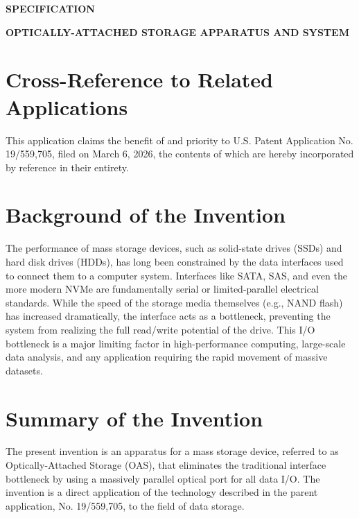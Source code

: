 \documentclass[11pt,letterpaper]{article}
\begin{document}
\thispagestyle{empty}

\begin{center}
    \textbf{\large SPECIFICATION}
\end{center}

\vspace{0.4cm}

\begin{center}
    \textbf{\large OPTICALLY-ATTACHED STORAGE APPARATUS AND SYSTEM}
\end{center}

\vspace{0.4cm}

\section*{Cross-Reference to Related Applications}

This application claims the benefit of and priority to U.S. Patent Application No. 19/559,705, filed on March 6, 2026, the contents of which are hereby incorporated by reference in their entirety.

\section*{Background of the Invention}

The performance of mass storage devices, such as solid-state drives (SSDs) and hard disk drives (HDDs), has long been constrained by the data interfaces used to connect them to a computer system. Interfaces like SATA, SAS, and even the more modern NVMe are fundamentally serial or limited-parallel electrical standards. While the speed of the storage media themselves (e.g., NAND flash) has increased dramatically, the interface acts as a bottleneck, preventing the system from realizing the full read/write potential of the drive. This I/O bottleneck is a major limiting factor in high-performance computing, large-scale data analysis, and any application requiring the rapid movement of massive datasets.

\section*{Summary of the Invention}

The present invention is an apparatus for a mass storage device, referred to as Optically-Attached Storage (OAS), that eliminates the traditional interface bottleneck by using a massively parallel optical port for all data I/O. The invention is a direct application of the technology described in the parent application, No. 19/559,705, to the field of data storage.
\end{document}
